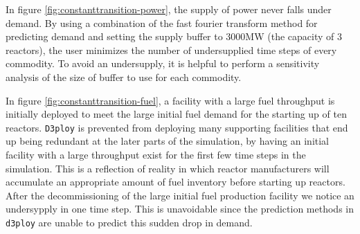 \documentclass[11pt]{article}
\newcommand{\deploy}{\texttt{d3ploy}\xspace}%
\newcommand{\Deploy}{\texttt{D3ploy}\xspace}%
\begin{document}
In figure \ref{fig:constanttransition-power}, the supply of power never falls under demand.
By using a combination of the fast fourier transform method for predicting 
demand and setting the supply buffer to 3000MW (the capacity of 3 reactors), 
the user minimizes the number of undersupplied time steps of every commodity. 
To avoid an undersupply, it is helpful to perform a
sensitivity analysis of the size 
of buffer to use for each commodity. 

In figure \ref{fig:constanttransition-fuel},
a facility with a large fuel throughput is initially
deployed to meet the large initial fuel demand for the starting
up of ten reactors. 
\Deploy is prevented from deploying many supporting
facilities that end up being redundant at the later parts of 
the simulation, by having an initial facility with a large throughput
exist for the first few time steps in the simulation.
This is a reflection of reality in which reactor manufacturers will 
accumulate an appropriate amount of fuel inventory before starting 
up reactors. 
After the decommissioning of the large initial fuel production facility
we notice an undersypply in one time step.
This is unavoidable since the prediction methods in \deploy are 
unable to predict this sudden drop in demand. 
\end{document}
